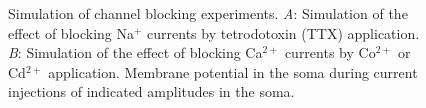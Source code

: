 \documentclass[12pt]{article}
\begin{document}
\begin{figure}[h]
   \caption{Simulation of channel blocking experiments. {\it A}: Simulation of the effect of blocking Na$^+$ currents by tetrodotoxin (TTX) application. {\it B}: Simulation of the effect of blocking Ca$^{2+}$ currents by Co$^{2+}$ or Cd$^{2+}$ application. Membrane potential in the soma during current injections of indicated amplitudes in the soma.}
   \label{fig:DS1.9}
\end{figure}



\end{document}

